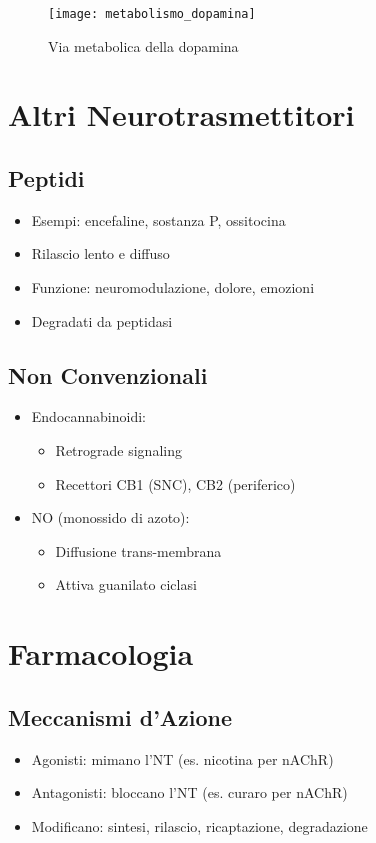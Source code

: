 \documentclass[12pt]{article}
\begin{document}
\begin{figure}[h]
    \centering
    \texttt{[image: metabolismo\_dopamina]}
    \caption{Via metabolica della dopamina}
\end{figure}

\section{Altri Neurotrasmettitori}
\subsection{Peptidi}
\begin{itemize}
    \item Esempi: encefaline, sostanza P, ossitocina
    \item Rilascio lento e diffuso
    \item Funzione: neuromodulazione, dolore, emozioni
    \item Degradati da peptidasi
\end{itemize}

\subsection{Non Convenzionali}
\begin{itemize}
    \item Endocannabinoidi:
    \begin{itemize}
        \item Retrograde signaling
        \item Recettori CB1 (SNC), CB2 (periferico)
    \end{itemize}
    \item NO (monossido di azoto):
    \begin{itemize}
        \item Diffusione trans-membrana
        \item Attiva guanilato ciclasi
    \end{itemize}
\end{itemize}

\section{Farmacologia}
\subsection{Meccanismi d'Azione}
\begin{itemize}
    \item Agonisti: mimano l'NT (es. nicotina per nAChR)
    \item Antagonisti: bloccano l'NT (es. curaro per nAChR)
    \item Modificano: sintesi, rilascio, ricaptazione, degradazione
\end{itemize}
\end{document}
